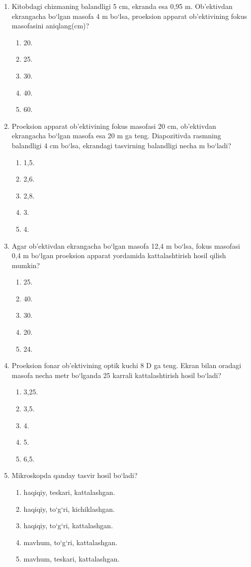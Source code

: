 \begin{enumerate}
\item Kitobdagi chizmaning balandligi 5 cm, ekranda esa 0,95 m. Ob’ektivdan ekrangacha bo‘lgan masofa 4 m bo‘lsa, proeksion apparat ob’ektivining fokus masofasini aniqlang(cm)?
\begin{enumerate}[label=\Alph*)]
\item 20.
\item 25.
\item 30.
\item 40.
\item 60.
\end{enumerate}

\item Proeksion apparat ob’ektivining fokus masofasi 20 cm, ob’ektivdan ekrangacha bo‘lgan masofa esa 20 m ga teng. Diapozitivda rasmning balandligi 4 cm bo‘lsa, ekrandagi tasvirning balandligi necha m bo‘ladi?
\begin{enumerate}[label=\Alph*)]
\item 1,5.
\item 2,6.
\item 2,8.
\item 3.
\item 4.
\end{enumerate}

\item Agar ob’ektivdan ekrangacha bo‘lgan masofa 12,4 m bo‘lsa, fokus masofasi 0,4 m bo‘lgan proeksion apparat yordamida kattalashtirish hosil qilish mumkin?
\begin{enumerate}[label=\Alph*)]
\item 25.
\item 40.
\item 30.
\item 20.
\item 24.
\end{enumerate}

\item Proeksion fonar ob’ektivining optik kuchi 8 D ga teng. Ekran bilan oradagi masofa necha metr bo‘lganda 25 karrali kattalashtirish hosil bo‘ladi?
\begin{enumerate}[label=\Alph*)]
\item 3,25.
\item 3,5.
\item 4.
\item 5.
\item 6,5.
\end{enumerate}

\item Mikroskopda qanday tasvir hosil bo‘ladi?
\begin{enumerate}[label=\Alph*)]
\item haqiqiy, teskari, kattalashgan.
\item haqiqiy, to‘g‘ri, kichiklashgan.
\item haqiqiy, to‘g‘ri, kattalashgan.
\item mavhum, to‘g‘ri, kattalashgan.
\item mavhum, teskari, kattalashgan.
\end{enumerate}


\end{enumerate}
